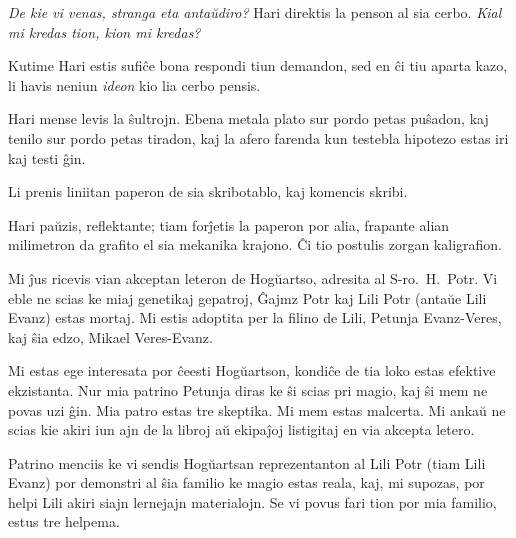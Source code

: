 

\emph{De kie vi venas, stranga eta antaŭdiro?}
Hari direktis la penson al sia cerbo.
\emph{Kial mi kredas tion, kion mi kredas?}

Kutime Hari estis sufiĉe bona respondi tiun demandon, sed en ĉi tiu aparta kazo, li havis neniun \emph{ideon} kio lia cerbo pensis.

Hari mense levis la ŝultrojn.
Ebena metala plato sur pordo petas puŝadon, kaj tenilo sur pordo petas tiradon, kaj la afero farenda kun testebla hipotezo estas iri kaj testi ĝin.

Li prenis liniitan paperon de sia skribotablo, kaj komencis skribi.

\begin{writtenNote}
\end{writtenNote}

Hari paŭzis, reflektante; tiam forĵetis la paperon por alia, frapante alian milimetron da grafito el sia mekanika krajono.
Ĉi tio postulis zorgan kaligrafion.

\begin{writtenNote}


Mi ĵus ricevis vian akceptan leteron de Hogŭartso, adresita al S\nobreakdash-ro.~H.~Potr.
Vi eble ne scias ke miaj genetikaj gepatroj, Ĝajmz Potr kaj Lili Potr (antaŭe Lili Evanz) estas mortaj.
Mi estis adoptita per la filino de Lili, Petunja Evanz-Veres, kaj ŝia edzo, Mikael Veres-Evanz.

Mi estas ege interesata por ĉeesti Hogŭartson, kondiĉe de tia loko estas efektive ekzistanta.
Nur mia patrino Petunja diras ke ŝi scias pri magio, kaj ŝi mem ne povas uzi ĝin.
Mia patro estas tre skeptika.
Mi mem estas malcerta.
Mi ankaŭ ne scias kie akiri iun ajn de la libroj aŭ ekipaĵoj listigitaj en via akcepta letero.

Patrino menciis ke vi sendis Hogŭartsan reprezentanton al Lili Potr (tiam Lili Evanz) por demonstri al ŝia familio ke magio estas reala, kaj, mi supozas, por helpi Lili akiri siajn lernejajn materialojn.
Se vi povus fari tion por mia familio, estus tre helpema.

\end{writtenNote}

